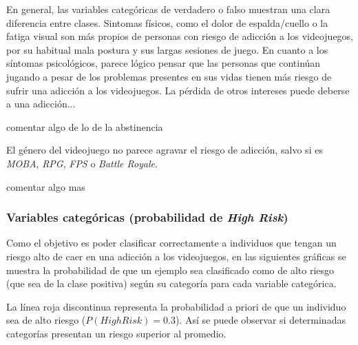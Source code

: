 \documentclass{article}
\begin{document}
En general, las variables categóricas de verdadero o falso muestran una clara diferencia entre clases. Sintomas físicos, como el dolor de espalda/cuello o la fatiga visual son más propios de personas con riesgo de adicción a los videojuegos, por su habitual mala postura y sus largas sesiones de juego. 
En cuanto a los síntomas psicológicos, parece lógico pensar que las personas que continúan jugando a pesar de los problemas presentes en sus vidas tienen más riesgo de sufrir una adicción a los videojuegos. La pérdida de otros intereses puede deberse a una adicción... %

comentar algo de lo de la abstinencia

El género del videojuego no parece agravar el riesgo de adicción, salvo si es \textit{MOBA}, \textit{RPG}, \textit{FPS} o \textit{Battle Royale}.

comentar algo mas


\subsubsection{Variables categóricas (probabilidad de \textit{High Risk})} 
Como el objetivo es poder clasificar correctamente a individuos que tengan un riesgo alto de caer en una adicción a los videojuegos, en las siguientes gráficas se muestra la probabilidad de que un ejemplo sea clasificado como de alto riesgo (que sea de la clase positiva) según su categoría para cada variable categórica.\newline

La línea roja discontinua representa la probabilidad a priori de que un individuo sea de alto riesgo ($P(High Risk) = 0.3$). Así se puede observar si determinadas categorías presentan un riesgo superior al promedio. 
\end{document}
